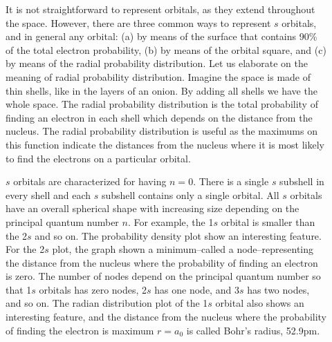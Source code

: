 \documentclass[main.tex]{subfiles}
\newcommand\chapterlabel{electrons}
\begin{document}
\begin{description}
\item[] 
It is not straightforward to represent orbitals, as they extend throughout the space. However, there are three common ways to represent $s$ orbitals, and in general any orbital: (a) by means of the surface that contains 90\% of the total electron probability, (b) by means of the orbital square, and (c) by means of the radial probability distribution. Let us elaborate on the meaning of radial probability distribution. Imagine the space is made of thin shells, like in the layers of an onion. By adding all shells we have the whole space. The radial probability distribution is the total probability of finding an electron in each shell which depends on the distance from the nucleus. The radial probability distribution is useful as the maximums on this function indicate the distances from the nucleus where it is most likely to find the electrons on a particular orbital.
\item[] 
$s$ orbitals are characterized for having $n=0$. There is a single $s$ subshell in every shell and each $s$ subshell contains only a single orbital. All $s$ orbitals have an overall spherical shape with increasing size depending on the principal quantum number $n$. For example, the 1$s$ orbital is smaller than the 2$s$ and so on. The probability density plot show an interesting feature. For the 2$s$ plot, the graph shown a minimum--called a node--representing the distance from the nucleus where the probability of finding an electron is zero. The number of nodes depend on the principal quantum number so that 1$s$ orbitals has zero nodes, 2$s$ has one node, and 3$s$ has two nodes, and so on. The radian distribution plot of the 1$s$ orbital also shows an interesting feature, and the distance from the nucleus where the probability of finding the electron is maximum $r=a_0$ is called Bohr's radius, 52.9pm.




     \label{Fig:{\chapterlabel}\thefigurenewcounter} \begin{center}
\begin{tikzpicture} [view angle=15, >=stealth, every node/.style={scale=1.0}]        


\end{tikzpicture}
\end{center}
\end{description}
\end{document}
